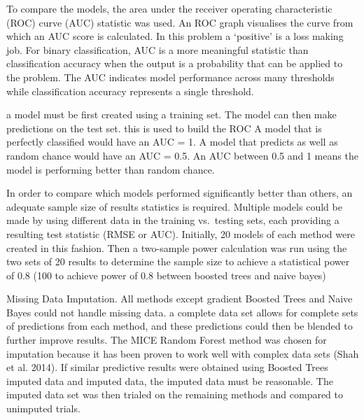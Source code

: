 \documentclass[]{elsarticle} %
\begin{document}
To compare the models, the area under the receiver operating
characteristic (ROC) curve (AUC) statistic was used. An ROC graph
visualises the curve from which an AUC score is calculated. In this
problem a `positive' is a loss making job. For binary classification,
AUC is a more meaningful statistic than classification accuracy when the
output is a probability that can be applied to the problem. The AUC
indicates model performance across many thresholds while classification
accuracy represents a single threshold.

a model must be first created using a training set. The model can then
make predictions on the test set. this is used to build the ROC A model
that is perfectly classified would have an AUC = 1. A model that
predicts as well as random chance would have an AUC = 0.5. An AUC
between 0.5 and 1 means the model is performing better than random
chance.

In order to compare which models performed significantly better than
others, an adequate sample size of results statistics is required.
Multiple models could be made by using different data in the training
vs.~testing sets, each providing a resulting test statistic (RMSE or
AUC). Initially, 20 models of each method were created in this fashion.
Then a two-sample power calculation was run using the two sets of 20
results to determine the sample size to achieve a statistical power of
0.8 (100 to achieve power of 0.8 between boosted trees and naive bayes)

Missing Data Imputation. All methods except gradient Boosted Trees and
Naive Bayes could not handle missing data. a complete data set allows
for complete sets of predictions from each method, and these predictions
could then be blended to further improve results. The MICE Random Forest
method was chosen for imputation because it has been proven to work well
with complex data sets (Shah et al. 2014). If similar predictive results
were obtained using Boosted Trees imputed data and imputed data, the
imputed data must be reasonable. The imputed data set was then trialed
on the remaining methods and compared to unimputed trials.
\end{document}
